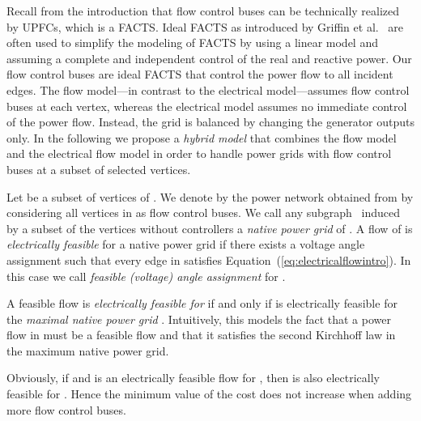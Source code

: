 \documentclass{article}[11pt,a4paper]
\begin{document}
Recall from the introduction that flow control buses can be technically realized by \mbox{UPFCs}, which is a FACTS. Ideal FACTS as introduced by Griffin et al.~\cite{julieGriffin} are often used to simplify the modeling of FACTS by using a linear model and assuming a complete and independent control of the real and reactive power. Our flow control buses are ideal FACTS that control the power flow to all incident edges. 
The flow model---in contrast to the electrical model---assumes flow control buses at each vertex, whereas the
electrical model assumes no immediate control of the power flow.  
Instead, the grid is balanced by changing
the generator outputs only.  In the following we propose a
\emph{hybrid model} that combines the flow model and the electrical flow model in order to handle power grids with flow control buses at a subset of selected vertices.

Let  be a subset of vertices of .  We denote by
 the power network obtained from  by considering all vertices in
 as flow control buses.  We call any subgraph~ induced by
a subset  of the vertices without controllers a \emph{native power grid} of .  A flow of  is
\emph{electrically feasible} for a native power grid 
if there exists a voltage angle assignment 
such that every edge in  satisfies
Equation~(\ref{eq:electricalflowintro}).  In this case we call
 \emph{feasible (voltage) angle assignment} for .

A feasible flow  is \emph{electrically feasible for } if and
only if  is electrically feasible for the \emph{maximal native
  power grid} .  Intuitively, this models the
fact that a power flow in  must be a feasible flow and that it
satisfies the second Kirchhoff law in the maximum native power grid.

Obviously, if  and  is an electrically feasible
flow for , then  is also electrically feasible for .
Hence the minimum value of the cost  does not increase when adding
more flow control buses.
\end{document}
